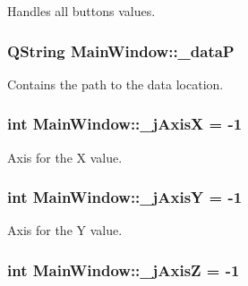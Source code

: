 Handles all buttons values. 

\hypertarget{a00005_aaccbe653019df03668429890e325ac21}{}
\subsubsection[{\+\_\+data\+P}]{\setlength{\rightskip}{0pt plus 5cm}Q\+String Main\+Window\+::\+\_\+data\+P\hspace{0.3cm}{\ttfamily [private]}}\label{a00005_aaccbe653019df03668429890e325ac21}


Contains the path to the data location. 

\hypertarget{a00005_a282d4090e96c676578c4336391b1af08}{}
\subsubsection[{\+\_\+j\+Axis\+X}]{\setlength{\rightskip}{0pt plus 5cm}int Main\+Window\+::\+\_\+j\+Axis\+X = -\/1\hspace{0.3cm}{\ttfamily [private]}}\label{a00005_a282d4090e96c676578c4336391b1af08}


Axis for the X value. 

\hypertarget{a00005_aaaced09ce813bbcac92047f5ef39f182}{}
\subsubsection[{\+\_\+j\+Axis\+Y}]{\setlength{\rightskip}{0pt plus 5cm}int Main\+Window\+::\+\_\+j\+Axis\+Y = -\/1\hspace{0.3cm}{\ttfamily [private]}}\label{a00005_aaaced09ce813bbcac92047f5ef39f182}


Axis for the Y value. 

\hypertarget{a00005_a18cc17eff4ff04ee0aae07c609e82d33}{}
\subsubsection[{\+\_\+j\+Axis\+Z}]{\setlength{\rightskip}{0pt plus 5cm}int Main\+Window\+::\+\_\+j\+Axis\+Z = -\/1\hspace{0.3cm}{\ttfamily [private]}}\label{a00005_a18cc17eff4ff04ee0aae07c609e82d33}


